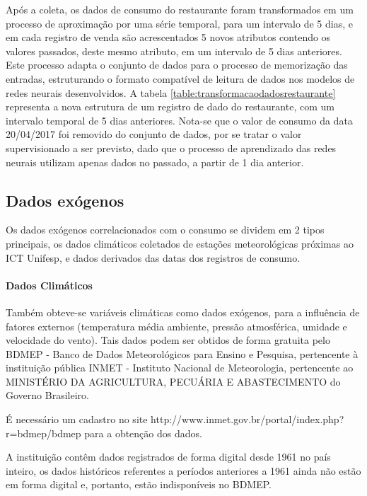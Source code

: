             Após a coleta, os dados de consumo do restaurante foram transformados em um processo de aproximação por uma série temporal, para um intervalo de 5 dias, e em cada registro de venda são acrescentados 5 novos atributos contendo os valores passados, deste mesmo atributo, em um intervalo de 5 dias anteriores. Este processo adapta o conjunto de dados para o processo de memorização das entradas, estruturando o formato compatível de leitura de dados nos modelos de redes neurais desenvolvidos. A tabela \ref{table:transformacaodadosrestaurante} representa a nova estrutura de um registro de dado do restaurante, com um intervalo temporal de 5 dias anteriores. Nota-se que o valor de consumo da data 20/04/2017 foi removido do conjunto de dados, por se tratar o valor supervisionado a ser previsto, dado que o processo de aprendizado das redes neurais utilizam apenas dados no passado, a partir de 1 dia anterior.
            
           
        \subsection{Dados exógenos}
            Os dados exógenos correlacionados com o consumo se dividem em 2 tipos principais, os dados climáticos coletados de estações meteorológicas próximas ao ICT Unifesp, e dados derivados das datas dos registros de consumo.
            
            \paragraph{Dados Climáticos}
            	Também obteve-se variáveis climáticas como dados exógenos, para a influência de fatores externos (temperatura média ambiente, pressão atmosférica, umidade e velocidade do vento). Tais dados podem ser obtidos de forma gratuita pelo BDMEP - Banco de Dados Meteorológicos para Ensino e Pesquisa, pertencente à instituição pública INMET - Instituto Nacional de Meteorologia, pertencente ao MINISTÉRIO DA AGRICULTURA, PECUÁRIA E ABASTECIMENTO do Governo Brasileiro. 
            	
            	É necessário um cadastro no site http://www.inmet.gov.br/portal/index.php?r=bdmep/bdmep para a obtenção dos dados. 
            	
            	A instituição contêm dados registrados de forma digital desde 1961 no país inteiro, os dados históricos referentes a períodos anteriores a 1961 ainda não estão em forma digital e, portanto, estão indisponíveis no BDMEP.
            	
